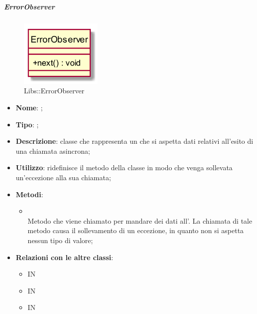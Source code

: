 \hypertarget{ErrorObserver_label}{\subparagraph{ErrorObserver}}
\begin{figure}[h]
	\centering
	\includegraphics[width=0.35\textwidth,height=\textheight,keepaspectratio]{images/ClassErrorObserver.png}
	\caption{Libs::ErrorObserver}
\end{figure}
\begin{itemize}
	\item \textbf{Nome}: ;
	\item \textbf{Tipo}: ;
	\item \textbf{Descrizione}: classe che rappresenta un  che si aspetta dati relativi all'esito di una chiamata asincrona;
	\item \textbf{Utilizzo}: ridefinisce il metodo  della classe  in modo che venga sollevata un'eccezione alla sua chiamata;
	\item \textbf{Metodi}:
	\begin{itemize}
		\item[]  \\		Metodo che viene chiamato per mandare dei dati all'. La chiamata di tale metodo causa il sollevamento di un eccezione, in quanto  non si aspetta nessun tipo di valore;\\
	\end{itemize}
	\item \textbf{Relazioni con le altre classi}:
	\begin{itemize}
		\item IN \hyperlink{ErrorObservable_label}{}
		\item IN \hyperlink{ErrorSubject_label}{}
		\item IN \hyperlink{ConversationApp_label}{}
	\end{itemize}
\end{itemize}
\FloatBarrier

